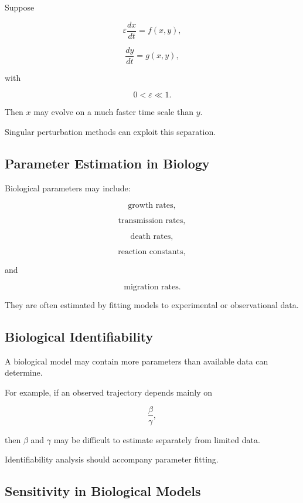 Suppose

\[
\boxed{
\varepsilon\frac{dx}{dt}
=
f(x,y),
}
\]

\[
\boxed{
\frac{dy}{dt}
=
g(x,y),
}
\]

with

\[
0<\varepsilon\ll1.
\]

Then \(x\) may evolve on a much faster time scale than \(y\).

Singular perturbation methods can exploit this separation.

\subsection{Parameter Estimation in Biology}
\label{subsec:biological-parameter-estimation}

Biological parameters may include:

\[
\boxed{
\text{growth rates},
}
\]

\[
\boxed{
\text{transmission rates},
}
\]

\[
\boxed{
\text{death rates},
}
\]

\[
\boxed{
\text{reaction constants},
}
\]

and

\[
\boxed{
\text{migration rates}.
}
\]

They are often estimated by fitting models to experimental or observational
data.

\subsection{Biological Identifiability}
\label{subsec:biological-identifiability}

A biological model may contain more parameters than available data can
determine.

For example, if an observed trajectory depends mainly on

\[
\frac{\beta}{\gamma},
\]

then \(\beta\) and \(\gamma\) may be difficult to estimate separately from
limited data.

Identifiability analysis should accompany parameter fitting.

\subsection{Sensitivity in Biological Models}
\label{subsec:biological-sensitivity}

